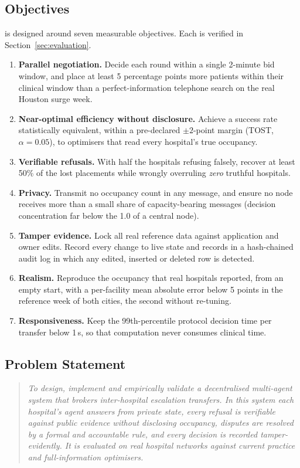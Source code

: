 \subsection{Objectives}
\label{sec:objectives}
\mahros{} is designed around seven measurable objectives. Each is verified in Section~\ref{sec:evaluation}.
\begin{enumerate}
\setlength{\itemsep}{2pt}
\item[O1] \textbf{Parallel negotiation.} Decide each round within a single 2-minute bid window, and place at least 5 percentage points more patients within their clinical window than a perfect-information telephone search on the real Houston surge week.
\item[O2] \textbf{Near-optimal efficiency without disclosure.} Achieve a success rate statistically equivalent, within a pre-declared $\pm2$-point margin (TOST, $\alpha=0.05$), to optimisers that read every hospital's true occupancy.
\item[O3] \textbf{Verifiable refusals.} With half the hospitals refusing falsely, recover at least 50\% of the lost placements while wrongly overruling \emph{zero} truthful hospitals.
\item[O4] \textbf{Privacy.} Transmit no occupancy count in any message, and ensure no node receives more than a small share of capacity-bearing messages (decision concentration far below the 1.0 of a central node).
\item[O5] \textbf{Tamper evidence.} Lock all real reference data against application and owner edits. Record every change to live state and records in a hash-chained audit log in which any edited, inserted or deleted row is detected.
\item[O6] \textbf{Realism.} Reproduce the occupancy that real hospitals reported, from an empty start, with a per-facility mean absolute error below 5 points in the reference week of both cities, the second without re-tuning.
\item[O7] \textbf{Responsiveness.} Keep the 99th-percentile protocol decision time per transfer below 1\,s, so that computation never consumes clinical time.
\end{enumerate}

\subsection{Problem Statement}
\begin{quote}
\emph{To design, implement and empirically validate a decentralised multi-agent system that brokers inter-hospital escalation transfers. In this system each hospital's agent answers from private state, every refusal is verifiable against public evidence without disclosing occupancy, disputes are resolved by a formal and accountable rule, and every decision is recorded tamper-evidently. It is evaluated on real hospital networks against current practice and full-information optimisers.}
\end{quote}

